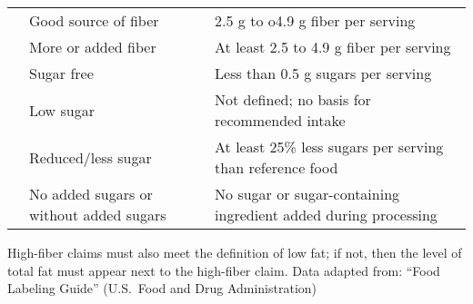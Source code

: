 \documentclass[title={Chapter 2}]{fdsn201notes}
\begin{document}
\begin{table}[H]
\begin{threeparttable}
\begin{tabular}{p{} p{} p{}}
			\rowcolor{rowlightgreen} & Good source of fiber & 2.5 g to o4.9 g fiber per serving \\
			\rowcolor{rowlightgreen} & More or added fiber & At least 2.5 to 4.9 g fiber per serving \\
			\rowcolor{rowlightgreen} & Sugar free & Less than 0.5 g sugars per serving \\
			\rowcolor{rowlightgreen} & Low sugar & Not defined; no basis for recommended intake \\
			\rowcolor{rowlightgreen} & Reduced/less sugar & At least 25\% less sugars per serving than reference food \\
			\rowcolor{rowlightgreen} \multirow[t]{-7}{0.11\textwidth}{Fiber and Sugar} & No added sugars or without added sugars & No sugar or sugar-containing ingredient added during processing \\
		\end{tabular}
		\begin{tablenotes}
			\small
			\item *High-fiber claims must also meet the definition of low fat; if not, then the level of total fat must appear next to the high-fiber claim.
			Data adapted from: ``Food Labeling Guide'' (U.S.\ Food and Drug Administration)
		\end{tablenotes}
	\end{threeparttable}
\end{table}
\end{document}
